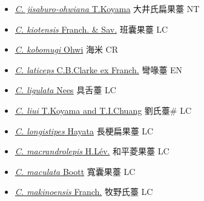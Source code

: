 \begin{itemize}
\begin{itemize}
        \item[] \href{http://www.theplantlist.org/tpl1.1/search?q=Carex+jisaburo-ohwiana}{\textit{C. jisaburo-ohwiana} T.Koyama}     大井氏扁果薹 NT
        \item[] \href{http://www.theplantlist.org/tpl1.1/search?q=Carex+kiotensis}{\textit{C. kiotensis} Franch. \& Sav.}   班囊果薹 LC
        \item[] \href{http://www.theplantlist.org/tpl1.1/search?q=Carex+kobomugi}{\textit{C. kobomugi} Ohwi}   海米 CR
        \item[] \href{http://www.theplantlist.org/tpl1.1/search?q=Carex+laticeps}{\textit{C. laticeps} C.B.Clarke ex Franch.}   彎喙薹 EN
        \item[] \href{http://www.theplantlist.org/tpl1.1/search?q=Carex+ligulata}{\textit{C. ligulata} Nees}   具舌薹 LC
        \item[] \href{http://www.theplantlist.org/tpl1.1/search?q=Carex+liui}{\textit{C. liui} T.Koyama and T.I.Chuang}   劉氏薹\# LC
        \item[] \href{http://www.theplantlist.org/tpl1.1/search?q=Carex+longistipes}{\textit{C. longistipes} Hayata}   長梗扁果薹 LC
        \item[] \href{http://www.theplantlist.org/tpl1.1/search?q=Carex+macrandrolepis}{\textit{C. macrandrolepis} H.Lév.}   和平菱果薹 LC
        \item[] \href{http://www.theplantlist.org/tpl1.1/search?q=Carex+maculata}{\textit{C. maculata} Boott}   寬囊果薹 LC
        \item[] \href{http://www.theplantlist.org/tpl1.1/search?q=Carex+makinoensis}{\textit{C. makinoensis} Franch.}   牧野氏薹 LC

\end{itemize}
\end{itemize}
